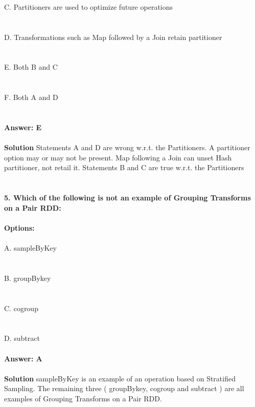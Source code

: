 \documentclass[prl,twocolumn,showpacs,preprintnumbers,superscriptaddress]{revtex4}
\theoremstyle{plain}
\theoremstyle{definition}
\begin{document}
\begin{widetext}
\\
\\
\\
C. Partitioners are used to optimize future operations
\\
\\
\\
D. Transformations such as Map followed by a Join retain partitioner
\\
\\
\\
E. Both B and C
\\
\\
\\
F. Both A and D
\\
\\
\\
\textbf{Answer: E}
\\
\\
\textbf{Solution}
Statements A and D are wrong w.r.t. the Partitioners. A partitioner option may or may not be present. Map following a Join can unset Hash partitioner, not retail it. Statements
B and C are true w.r.t. the Partitioners
\\
\\
\\
\noindent\textbf{5. Which of the following is not an example of Grouping Transforms on a Pair RDD:}
\\
\\
\textbf{Options:}
\\
\\
\noindent A. sampleByKey
\\
\\
\\
B. groupBykey
\\
\\
\\
C. cogroup
\\
\\
\\
D. subtract
\\
\\
\textbf{Answer: A}
\\
\\
\textbf{Solution}
sampleByKey is an example of an operation based on Stratified Sampling. The remaining three ( groupBykey, cogroup and subtract ) are all examples of Grouping Transforms on a Pair RDD.
\\
\\
\\
\end{widetext}
\end{document}

